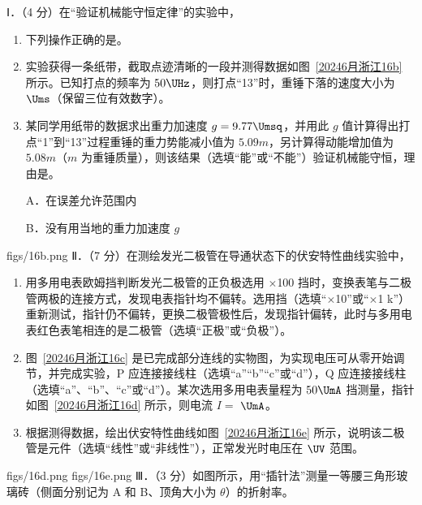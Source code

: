 \documentclass[\gkver]{gaokaozhenti}
\begin{document}
\begin{enumerate}
Ⅰ．（4 分）在“验证机械能守恒定律”的实验中，

\begin{enumerate}
	\item
	下列操作正确的是。
	\item
	实验获得一条纸带，截取点迹清晰的一段并测得数据如图~\ref{20246月浙江16b} 所示。已知打点的频率为 $50\UHz$，则打点“13”时，重锤下落的速度大小为 $\Ums$（保留三位有效数字）。
	\item
	某同学用纸带的数据求出重力加速度 $g = 9.77\Umsq$，并用此 $g$ 值计算得出打点“1”到“13”过程重锤的重力势能减小值为 $5.09m$，另计算得动能增加值为 $5.08m$（$m$ 为重锤质量），则该结果（选填“能”或“不能”）验证机械能守恒，理由是。

	A．在误差允许范围内

	B．没有用当地的重力加速度 $g$
\end{enumerate}
\twopicture[labelA=20246月浙江16a, labelB=20246月浙江16b, hA=2.30cm, hB=1.50cm, align=right]
{}
{figs/16b.png}
Ⅱ．（7 分）在测绘发光二极管在导通状态下的伏安特性曲线实验中，

\begin{enumerate}
	\item
	用多用电表欧姆挡判断发光二极管的正负极选用 $\times$100 挡时，变换表笔与二极管两极的连接方式，发现电表指针均不偏转。选用挡（选填“$\times$10”或“$\times$1 k”）重新测试，指针仍不偏转，更换二极管极性后，发现指针偏转，此时与多用电表红色表笔相连的是二极管（选填“正极”或“负极”）。
	\item
	图~\ref{20246月浙江16c} 是已完成部分连线的实物图，为实现电压可从零开始调节，并完成实验，P 应连接接线柱（选填“a”“b”“c”或“d”），Q 应连接接线柱（选填“a”、“b”、“c”或“d”）。某次选用多用电表量程为 $50\UmA$ 挡测量，指针如图~\ref{20246月浙江16d} 所示，则电流 $I = $ $\UmA$。
	\item
	根据测得数据，绘出伏安特性曲线如图~\ref{20246月浙江16e} 所示，说明该二极管是元件（选填“线性”或“非线性”），正常发光时电压在 $\UV$ 范围。
\end{enumerate}
{figs/16d.png}
{figs/16e.png}
Ⅲ．（3 分）如图所示，用“插针法”测量一等腰三角形玻璃砖（侧面分别记为 A 和 B、顶角大小为 $\theta$）的折射率。


\end{enumerate}
\end{document}

